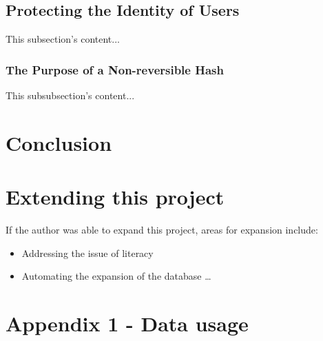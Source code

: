 \documentclass{article}
\begin{document}
\subsection{Protecting the Identity of Users}
This subsection's content...

\subsubsection{The Purpose of a Non-reversible Hash}
This subsubsection's content...

\newpage

\section{Conclusion}
\label{sec:conclusion}

\newpage

\section{Extending this project}
If the author was able to expand this project, areas for expansion include:
\begin{itemize}
  \item Addressing the issue of literacy
  \item Automating the expansion of the database \ldots
\end{itemize}

\newpage

{}


\section{Appendix 1 - Data usage}
\end{document}
